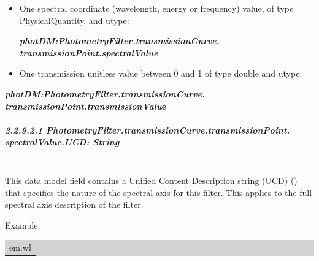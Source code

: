 \documentclass[11pt,a4paper]{ivoa}
\begin{document}
\begin{itemize}
	\item One spectral coordinate (wavelength, energy or frequency) value, of type PhysicalQuantity, and utype:\par

\begin{center}
{\fontsize{10pt}{12.0pt}\selectfont \textbf{\textit{photDM:PhotometryFilter.transmissionCurve.
transmissionPoint.spectralValue}}\par}
\end{center}\par

	\item One transmission unitless value between 0 and 1 of type double and utype:{\fontsize{11pt}{13.2pt}\selectfont \textit{ }\par}
\end{itemize}\par

\begin{center}
{\fontsize{10pt}{12.0pt}\selectfont \textbf{\textit{photDM:PhotometryFilter.transmissionCurve.
transmissionPoint.transmissionValu}e}\par}
\end{center}\par

\subparagraph{3.2.9.2.1
PhotometryFilter.transmissionCurve.transmissionPoint.
spectralValue.UCD: String} \hspace{0pt} \\
This data model field contains a Unified Content Description string (UCD) (\citep{2007ivoa.spec.0402M}) that specifies the nature of the spectral axis for this filter. This applies to the full spectral axis description of the filter.
\par

Example:
\par



\bigskip
\par
\begingroup\setlength{\fboxsep}{0pt}
\colorbox{lightgray}{%
\begin{tabular}{|p{5.53in}|}
em.wl
\end{tabular}%
}\endgroup
\par
\bigskip



\end{document}
